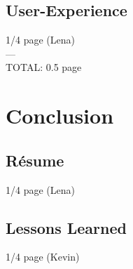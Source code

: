 \documentclass{sigchi}
\begin{document}
\subsection{User-Experience}
1/4 page (Lena)\\
---\\
TOTAL: 0.5 page

\section{Conclusion}
\subsection{R{\'e}sume}
1/4 page (Lena)
\subsection{Lessons Learned}
1/4 page (Kevin)
\end{document}
